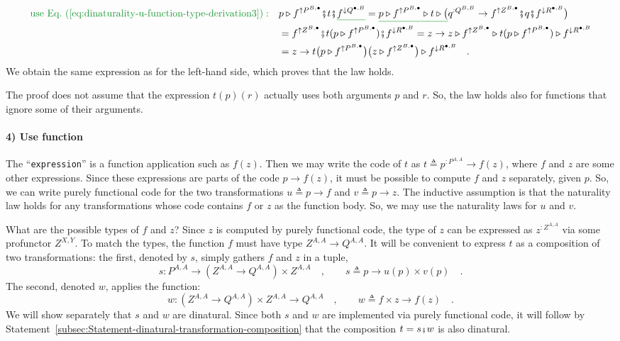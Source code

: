 \begin{align*}
{\color{greenunder}\text{use Eq.~(\ref{eq:dinaturality-u-function-type-derivation3})}:}\quad & p\triangleright f^{\uparrow P^{B,\bullet}}\bef t\bef\gunderline{f^{\downarrow Q^{\bullet,B}}}=\gunderline{p\triangleright f^{\uparrow P^{B,\bullet}}\triangleright t\triangleright\big(}q^{:Q^{B,B}}\rightarrow f^{\uparrow Z^{B,\bullet}}\bef q\bef f^{\downarrow R^{\bullet,B}}\big)\\
 & =f^{\uparrow Z^{B,\bullet}}\bef t(p\triangleright f^{\uparrow P^{B,\bullet}})\bef f^{\downarrow R^{\bullet,B}}=z\rightarrow z\triangleright f^{\uparrow Z^{B,\bullet}}\triangleright t(p\triangleright f^{\uparrow P^{B,\bullet}})\triangleright f^{\downarrow R^{\bullet,B}}\\
 & =z\rightarrow t\big(p\triangleright f^{\uparrow P^{B,\bullet}}\big)\big(z\triangleright f^{\uparrow Z^{B,\bullet}}\big)\triangleright f^{\downarrow R^{\bullet,B}}\quad.
\end{align*}
We obtain the same expression as for the left-hand side, which proves
that the law holds.

The proof does not assume that the expression $t(p)(r)$ actually
uses both arguments $p$ and $r$. So, the law holds also for functions
that ignore some of their arguments.

\paragraph{4) Use function }

The ``\lstinline!expression!'' is a function application such as
$f(z)$. Then we may write the code of $t$ as $t\triangleq p^{:P^{A,A}}\rightarrow f(z)$,
where $f$ and $z$ are some other expressions. Since these expressions
are parts of the code $p\rightarrow f(z)$, it must be possible to
compute $f$ and $z$ separately, given $p$. So, we can write purely
functional code for the two transformations $u\triangleq p\rightarrow f$
and $v\triangleq p\rightarrow z$. The inductive assumption is that
the naturality law holds for any transformations whose code contains
$f$ or $z$ as the function body. So, we may use the naturality laws
for $u$ and $v$.

What are the possible types of $f$ and $z$? Since $z$ is computed
by purely functional code, the type of $z$ can be expressed as $z^{:Z^{A,A}}$
via some profunctor $Z^{X,Y}$. To match the types, the function $f$
must have type $Z^{A,A}\rightarrow Q^{A,A}$. It will be convenient
to express $t$ as a composition of two transformations: the first,
denoted by $s$, simply gathers $f$ and $z$ in a tuple,
\[
s:P^{A,A}\rightarrow(Z^{A,A}\rightarrow Q^{A,A})\times Z^{A,A}\quad,\quad\quad s\triangleq p\rightarrow u(p)\times v(p)\quad.
\]
The second, denoted $w$, applies the function:
\[
w:(Z^{A,A}\rightarrow Q^{A,A})\times Z^{A,A}\rightarrow Q^{A,A}\quad,\quad\quad w\triangleq f\times z\rightarrow f(z)\quad.
\]
We will show separately that $s$ and $w$ are dinatural. Since both
$s$ and $w$ are implemented via purely functional code, it will
follow by Statement~\ref{subsec:Statement-dinatural-transformation-composition}
that the composition $t=s\bef w$ is also dinatural.

